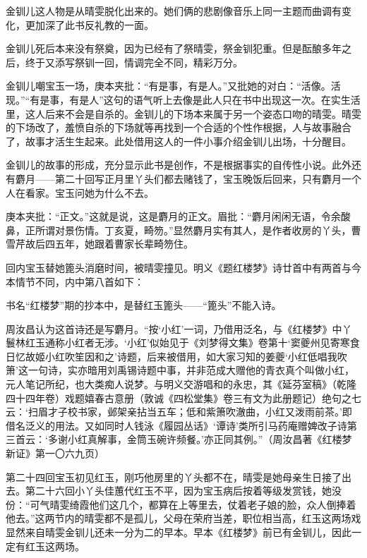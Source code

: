 \par 金钏儿这人物是从晴雯脱化出来的。她们俩的悲剧像音乐上同一主题而曲调有变化，更加深了此书反礼教的一面。
\par 金钏儿死后本来没有祭奠，因为已经有了祭晴雯，祭金钏犯重。但是酝酿多年之后，终于又添写祭钏一回，情调完全不同，精彩万分。
\par 金钏儿嘲宝玉一场，庚本夹批：“有是事，有是人。”又批她的对白：“活像。活现。”“有是事，有是人”这句的语气听上去像是此人只在书中出现这一次。在实生活里，这人后来不会是自杀的。金钏儿的下场本来属于另一个姿态口吻的晴雯。晴雯的下场改了，羞愤自杀的下场就等再找到一个合适的个性作根据，人与故事融合了，故事才活生生起来。此处借用这人的一件小事介绍金钏儿出场，十分醒目。
\par 金钏儿的故事的形成，充分显示此书是创作，不是根据事实的自传性小说。此外还有麝月——第二十回写正月里丫头们都去赌钱了，宝玉晚饭后回来，只有麝月一个人在看家。宝玉问她为什么不去。
\par 庚本夹批：“正文。”这就是说，这是麝月的正文。眉批：“麝月闲闲无语，令余酸鼻，正所谓对景伤情。丁亥夏，畸笏。”显然麝月实有其人，是作者收房的丫头，曹雪芹故后四五年，她跟着曹家长辈畸笏住。
\par 回内宝玉替她篦头消磨时间，被晴雯撞见。明义《题红楼梦》诗廿首中有两首与今本情节不同，内中第八首如下：
\par 书名“红楼梦”期的抄本中，是替红玉篦头——“篦头”不能入诗。
\par 周汝昌认为这首诗还是写麝月。“按‘小红’一词，乃借用泛名，与《红楼梦》中丫鬟林红玉通称小红者无涉。‘小红’似始见于《刘梦得文集》卷第十‘窦夔州见寄寒食日忆故姬小红吹笙因和之’诗题，后来被借用，如大家习知的姜夔‘小红低唱我吹箫’这一句诗，实亦暗用刘禹锡诗题中事，并非范成大赠他的青衣真个叫做小红，元人笔记所纪，也大类痴人说梦。与明义交游唱和的永忠，其《延芬室稿》（乾隆四十四年卷）戏题嬉春古意册（敦诚《四松堂集》卷三有文为此册题记）绝句之七云：‘扫眉才子校书家，邺架亲拈当五车；低和紫箫吹澈曲，小红又泼雨前茶。’即借名泛义的用法。又如同时人钱泳《履园丛话》‘谭诗’类所引马药庵赠婢改子诗第三首云：‘多谢小红真解事，金筒玉碗许频餐。’亦正同其例。”（周汝昌著《红楼梦新证》第一〇六九页）
\par 第二十四回宝玉初见红玉，刚巧他房里的丫头都不在，晴雯是她母亲生日接了出去。第二十六回小丫头佳蕙代红玉不平，因为宝玉病后按着等级发赏钱，她没份：“可气晴雯绮霞他们这几个，都算在上等里去，仗着老子娘的脸，众人倒捧着他去。”这两节内的晴雯都不是孤儿，父母在荣府当差，职位相当高，红玉这两场戏显然来自晴雯金钏儿还未一分为二的早本。早本《红楼梦》前已有金钏儿，因此一定有红玉这两场。
